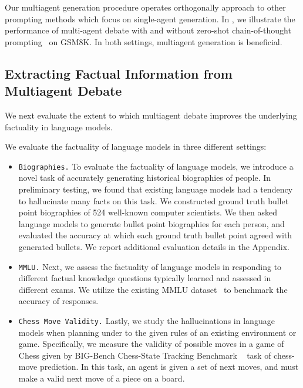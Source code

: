  Our multiagent generation procedure operates orthogonally approach to other prompting methods which focus on single-agent generation. In , we illustrate the performance of multi-agent debate with and without zero-shot chain-of-thought prompting~\cite{kojima2022large} on GSM8K. In both settings, multiagent generation is beneficial.








\vspace{-3pt}
\subsection{Extracting Factual Information from Multiagent Debate}

We next evaluate the extent to which multiagent debate improves the underlying factuality in language models.

 We evaluate the factuality of language models in three different settings:

\begin{itemize}[leftmargin=*,nosep]
    \item \texttt{Biographies.} To evaluate the factuality of language models, we introduce a novel task of accurately generating historical biographies of people. In preliminary testing, we found that existing language models had a tendency to hallucinate many facts on this task. We constructed ground truth bullet point biographies of 524 well-known computer scientists. We then asked language models to generate bullet point biographies for each person, and evaluated the accuracy at which each ground truth bullet point agreed with generated bullets. We report additional evaluation details in the Appendix.
    \item \texttt{MMLU.} Next, we assess the factuality of language models in responding to different factual knowledge questions typically learned and assessed in different exams. We utilize the existing MMLU dataset~\cite{hendrycks2020measuring}  to benchmark the accuracy of responses. 
    \item \texttt{Chess Move Validity.} Lastly, we study the hallucinations in language models when planning under to the given rules of an existing environment or game. Specifically, we measure the validity of possible moves in a game of Chess given by BIG-Bench Chess-State Tracking Benchmark ~\cite{srivastava2022beyond} task of chess-move prediction. In this task, an agent is given a set of next moves, and must make a valid next move of a piece on a board.
\end{itemize}

